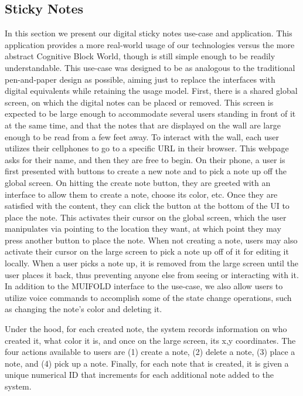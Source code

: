 \subsection{Sticky Notes}

In this section we present our digital sticky notes use-case and application. This
application provides a more real-world usage of our technologies versus the more
abstract Cognitive Block World, though is still simple enough to be readily
understandable. This use-case was designed to be as analogous to the traditional
pen-and-paper design as possible, aiming just to replace the interfaces with digital
equivalents while retaining the usage model. First, there is a shared global screen,
on which the digital notes can be placed or removed. This screen is expected to be
large enough to
accommodate several users standing in front of it at the same time, and that the notes
that are displayed on the wall are large enough to be read from a few feet away. To
interact with the wall, each user utilizes their cellphones to go to a specific URL in
their browser. This webpage asks for their name, and then they are free to begin. On
their phone, a user is first presented with buttons to create a new note and to pick
a note up off the global screen. On hitting the create note button, they are greeted
with an interface to allow them to create a note, choose its color, etc. Once they are
satisfied with the content, they can click the button at the bottom of the UI to place
the note. This activates their cursor on the global screen, which the user manipulates
via pointing to the location they want, at which point they may press another button
to place the note. When not creating a note, users may also activate their cursor on
the large screen to pick a note up off of it for editing it locally. When a user picks
a note up, it is removed from the large screen until the user places it back, thus
preventing anyone else from seeing or interacting with it. In addition to the MUIFOLD
interface to the use-case, we also allow users to utilize voice commands to accomplish
some of the state change operations, such as changing the note's color and deleting it.

Under the hood, for each created note, the system records information on who created it,
what color it is, and once on the large screen, its x,y coordinates. The four actions
available to users are (1) create a note, (2) delete a note, (3) place a note, and (4)
pick up a note. Finally, for each note that is created, it is given a unique numerical
ID that increments for each additional note added to the system.